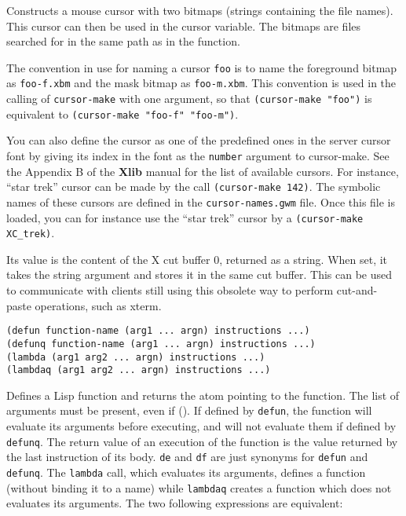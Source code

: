 Constructs a mouse cursor with two bitmaps (strings containing the file
names). This cursor can then be used in the cursor variable. The bitmaps are
files searched for in the same path as in the  function.

\sloppy The convention in use for naming a cursor \verb"foo" is to name the
foreground bitmap as \verb"foo-f.xbm" and the mask bitmap as
\verb"foo-m.xbm". This convention is used in the calling of
\verb"cursor-make" with one argument, so that \verb|(cursor-make "foo")| is
equivalent to \verb|(cursor-make "foo-f" "foo-m")|.

You can also define the cursor as one of the predefined ones in the server
cursor font by giving its index in the font as the \verb"number" argument to
cursor-make. See the Appendix B of the {\bf Xlib} manual for the list of
available cursors. For instance, ``star trek'' cursor can be made by the
call \verb"(cursor-make 142)".
The symbolic names of these cursors are defined in the \verb"cursor-names.gwm"
file. Once this file is loaded, you can for instance use the ``star trek''
cursor by a \verb"(cursor-make XC_trek)".

        

Its value is the content of the X cut buffer 0, returned as a string.  When
set, it takes the string argument and stores it in the same cut buffer. This
can be used to communicate with clients still using this obsolete way to
perform cut-and-paste operations, such as xterm. 

        
{\usagefont\begin{verbatim}
(defun function-name (arg1 ... argn) instructions ...)
(defunq function-name (arg1 ... argn) instructions ...)
(lambda (arg1 arg2 ... argn) instructions ...)
(lambdaq (arg1 arg2 ... argn) instructions ...)
\end{verbatim}}\usageupspace

Defines a Lisp function and returns the atom pointing to the function. The
list of arguments must be present, even if ().  If defined by \verb"defun",
the function will evaluate its arguments before executing, and will not
evaluate them if defined by \verb"defunq". The return value of an execution
of the function is the value returned by the last instruction of its body.
\verb"de" and \verb"df" are just synonyms for \verb"defun" and
\verb"defunq". The \verb"lambda" call, which evaluates its arguments,
defines a function (without binding it to a name) while \verb"lambdaq"
creates a function which does not evaluates its arguments. The two following
expressions are equivalent:

